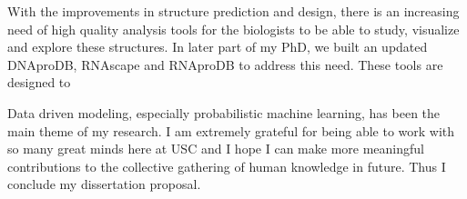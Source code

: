 With the improvements in structure prediction and design, there is an increasing need of high quality analysis tools for the biologists to be able to study, visualize and explore these structures. In later part of my PhD, we built an updated DNAproDB, RNAscape \citep{Mitra2024rnascape} and RNAproDB to address this need. These tools are 
designed to 

Data driven modeling, especially probabilistic machine learning, has been the main theme of my
research. I am extremely grateful for being able to work with so many great minds here at USC and I
hope I can make more meaningful contributions to the collective gathering of human knowledge in
future. Thus I conclude my dissertation proposal.
